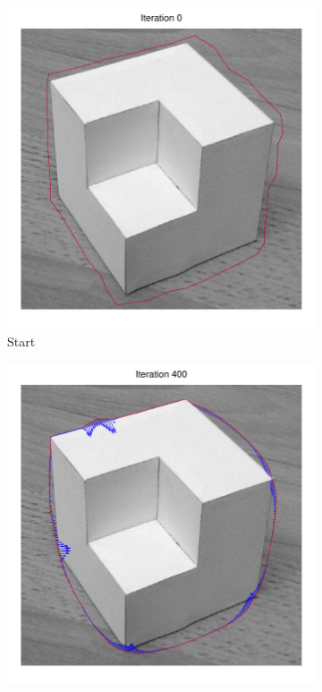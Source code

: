 \documentclass[11pt,a4paper]{article}
\begin{document}
\begin{figure}[H]
    \centering
    \begin{subfigure}[t]{0.48\textwidth}
        \includegraphics[width=\textwidth]{src/images/cubic_0.pdf}
        \caption{Start}
        \label{fig:cubic_grayscale}
    \end{subfigure}
    \begin{subfigure}[t]{0.48\textwidth}
        \includegraphics[width=\textwidth]{src/images/cubic_400.pdf}

\end{subfigure}
\end{figure}
\end{document}
